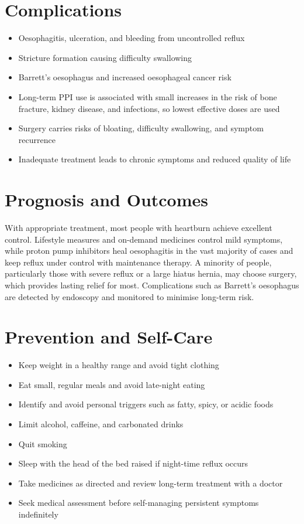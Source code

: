 \section*{Complications}
\begin{itemize}
    \item Oesophagitis, ulceration, and bleeding from uncontrolled reflux
    \item Stricture formation causing difficulty swallowing
    \item Barrett's oesophagus and increased oesophageal cancer risk
    \item Long-term PPI use is associated with small increases in the risk of bone fracture, kidney disease, and infections, so lowest effective doses are used
    \item Surgery carries risks of bloating, difficulty swallowing, and symptom recurrence
    \item Inadequate treatment leads to chronic symptoms and reduced quality of life
\end{itemize}

\section*{Prognosis and Outcomes}
With appropriate treatment, most people with heartburn achieve excellent control. Lifestyle measures and on-demand medicines control mild symptoms, while proton pump inhibitors heal oesophagitis in the vast majority of cases and keep reflux under control with maintenance therapy. A minority of people, particularly those with severe reflux or a large hiatus hernia, may choose surgery, which provides lasting relief for most. Complications such as Barrett's oesophagus are detected by endoscopy and monitored to minimise long-term risk.

\section*{Prevention and Self-Care}
\begin{itemize}
    \item Keep weight in a healthy range and avoid tight clothing
    \item Eat small, regular meals and avoid late-night eating
    \item Identify and avoid personal triggers such as fatty, spicy, or acidic foods
    \item Limit alcohol, caffeine, and carbonated drinks
    \item Quit smoking
    \item Sleep with the head of the bed raised if night-time reflux occurs
    \item Take medicines as directed and review long-term treatment with a doctor
    \item Seek medical assessment before self-managing persistent symptoms indefinitely
\end{itemize}

